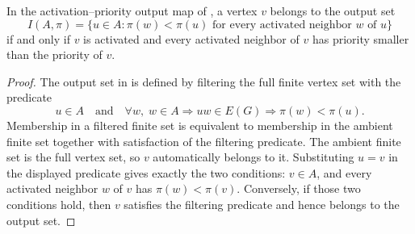 \begin{helper}
In the activation--priority output map of
, a vertex $v$ belongs to the output
set
\[
I(A,\pi)=\{u\in A:\pi(w)<\pi(u)\text{ for every activated neighbor }w
\text{ of }u\}
\]
if and only if $v$ is activated and every activated neighbor of $v$ has
priority smaller than the priority of $v$.
\end{helper}
\begin{proof}
The output set in  is defined by
filtering the full finite vertex set with the predicate
\[
u\in A\quad\text{and}\quad
\forall w,\; w\in A\Rightarrow uw\in E(G)\Rightarrow \pi(w)<\pi(u).
\]
Membership in a filtered finite set is equivalent to membership in the
ambient finite set together with satisfaction of the filtering predicate.
The ambient finite set is the full vertex set, so $v$ automatically belongs
to it.  Substituting $u=v$ in the displayed predicate gives exactly the two
conditions: $v\in A$, and every activated neighbor $w$ of $v$ has
$\pi(w)<\pi(v)$.  Conversely, if those two conditions hold, then $v$
satisfies the filtering predicate and hence belongs to the output set.
\end{proof}

